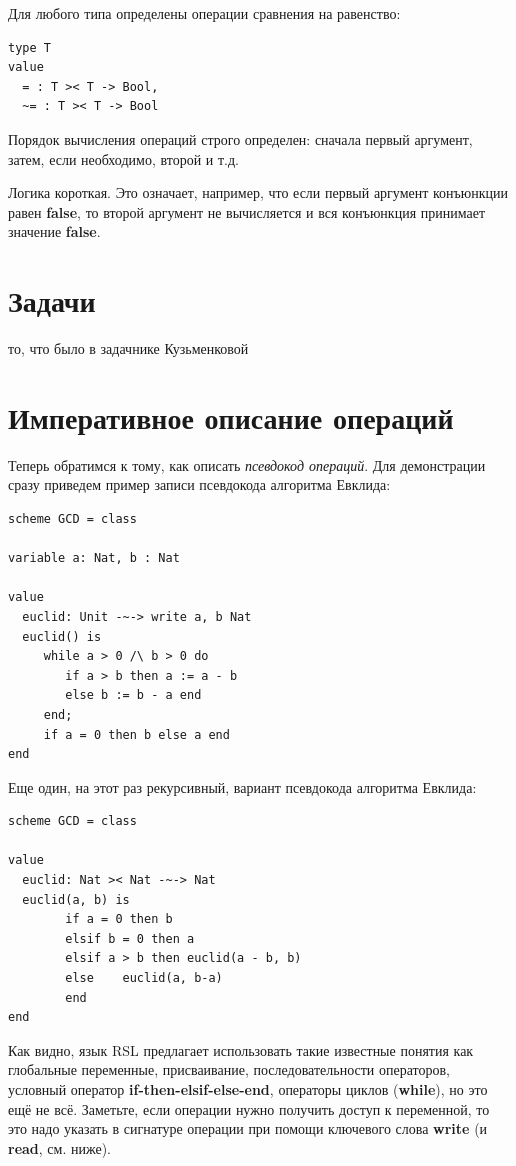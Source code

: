 \documentclass[14pt, twoside]{extreport}
\begin{document}
Для любого типа определены операции сравнения на равенство:
\begin{lstlisting}
type T
value
  = : T >< T -> Bool,
  ~= : T >< T -> Bool
\end{lstlisting}

Порядок вычисления операций строго определен: сначала первый аргумент, затем, если необходимо, второй и т.д.

Логика короткая. Это означает, например, что если первый аргумент конъюнкции равен \textbf{false}, то второй аргумент не вычисляется и вся конъюнкция принимает значение \textbf{false}.

\section*{Задачи}

то, что было в задачнике Кузьменковой

\section{Императивное описание операций}

Теперь обратимся к тому, как описать \emph{псевдокод операций}. Для демонстрации сразу приведем пример записи псевдокода алгоритма Евклида:

\begin{lstlisting}
scheme GCD = class

variable a: Nat, b : Nat

value
  euclid: Unit -~-> write a, b Nat
  euclid() is
     while a > 0 /\ b > 0 do
        if a > b then a := a - b
        else b := b - a end
     end;
     if a = 0 then b else a end
end
\end{lstlisting}

Еще один, на этот раз рекурсивный, вариант псевдокода алгоритма Евклида:

\begin{lstlisting}
scheme GCD = class

value
  euclid: Nat >< Nat -~-> Nat
  euclid(a, b) is
		if a = 0 then b 
		elsif b = 0 then a
		elsif a > b then euclid(a - b, b)
		else	euclid(a, b-a)
		end
end
\end{lstlisting}

Как видно, язык RSL предлагает использовать такие известные понятия как глобальные переменные, присваивание, последовательности операторов, условный оператор \textbf{if-then-elsif-else-end}, операторы циклов (\textbf{while}), но это ещё не всё. Заметьте, если операции нужно получить доступ к переменной, то это надо указать в сигнатуре операции при помощи ключевого слова \textbf{write} (и \textbf{read}, см. ниже).
\end{document}
